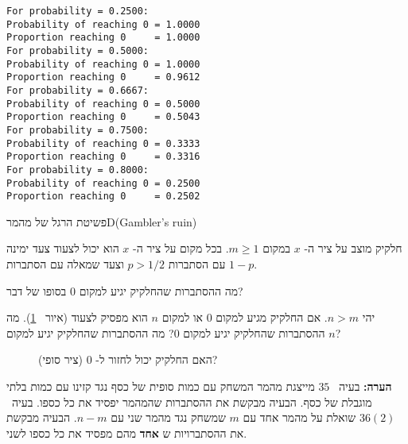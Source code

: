 \sml{}

\begin{verbatim}
For probability = 0.2500:
Probability of reaching 0 = 1.0000
Proportion reaching 0     = 1.0000
For probability = 0.5000:
Probability of reaching 0 = 1.0000
Proportion reaching 0     = 0.9612
For probability = 0.6667:
Probability of reaching 0 = 0.5000
Proportion reaching 0     = 0.5043
For probability = 0.7500:
Probability of reaching 0 = 0.3333
Proportion reaching 0     = 0.3316
For probability = 0.8000:
Probability of reaching 0 = 0.2500
Proportion reaching 0     = 0.2502
\end{verbatim}


\begin{prob}{פשיטת הרגל של מהמר}{D}{(Gambler's ruin)}

חלקיק מוצב על ציר ה-%
$x$
במקום
$m\geq 1$.
בכל מקום על ציר ה-%
$x$
הוא יכול לצעוד צעד ימינה עם הסתברות
$p>1/2$
וצעד שמאלה עם הסתברות
$1-p$.

מה ההסתברות שהחלקיק יגיע למקום
$0$
בסופו של דבר?

 יהי 
$n>m$.
אם החלקיק מגיע למקום 
$0$
או למקום
$n$
הוא מפסיק לצעוד (איור%
~\ref{f.ruin3}).
מה ההסתברות שהחלקיק יגיע למקום 
$0$?
מה ההסתברות שהחלקיק יגיע למקום
$n$?
\begin{figure}[tb]
\begin{center}
\end{center}
\caption{האם החלקיק יכול לחזור ל-%
$0$ (ציר סופי)?}
\label{f.ruin3}
\end{figure}

\textbf{הערה:} 
בעיה%
~$35$
מייצגת מהמר המשחק עם כמות סופית של כסף נגד קזינו עם כמות בלתי מוגבלת של כסף. הבעיה מבקשת את ההסתברות שהמהמר יפסיד את כל כספו. בעיה~%
$36(2)$
שואלת על מהמר אחד עם 
$m$
שמשחק נגד מהמר שני עם 
$n-m$.
הבעיה מבקשת את ההסתברויות ש%
\textbf{אחד}
מהם מפסיד את כל כספו לשני.
\end{prob}

\solution{}

